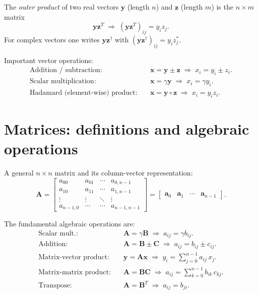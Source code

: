 The \emph{outer product} of two real vectors $\bm{y}$ (length $n$)
and $\bm{z}$ (length $m$) is the $n\times m$ matrix
\[
  \bm{y}\bm{z}^{T} \;\Longrightarrow\; (\bm{y}\bm{z}^T)_{ij} = y_i z_j.
\]
For complex vectors one writes $\bm{y}\bm{z}^{\dagger}$ with
$(\bm{y}\bm{z}^{\dagger})_{ij}=y_i z_j^*$.

Important vector operations:
\begin{align*}
  \text{Addition / subtraction:}\quad
      &\bm{x} = \bm{y}\pm\bm{z} \;\Rightarrow\; x_i = y_i\pm z_i.\\
  \text{Scalar multiplication:}\quad
      &\bm{x} = \gamma\bm{y} \;\Rightarrow\; x_i = \gamma y_i.\\
  \text{Hadamard (element-wise) product:}\quad
      &\bm{x} = \bm{y}\circ\bm{z} \;\Rightarrow\; x_i = y_i z_i.
\end{align*}

\section{Matrices: definitions and algebraic operations}
\label{sec:matrices}

A general $n\times n$ matrix and its column-vector representation:
\[
  \bm{A}
  = \begin{bmatrix}
      a_{00} & a_{01} & \cdots & a_{0,n-1} \\
      a_{10} & a_{11} & \cdots & a_{1,n-1} \\
      \vdots & \vdots & \ddots & \vdots    \\
      a_{n-1,0} & \cdots & \cdots & a_{n-1,n-1}
    \end{bmatrix}
  = \begin{bmatrix}
      \bm{a}_0 & \bm{a}_1 & \cdots & \bm{a}_{n-1}
    \end{bmatrix}.
\]

The fundamental algebraic operations are:
\begin{align*}
  \text{Scalar mult.:}\quad
      &\bm{A}=\gamma\bm{B} \;\Rightarrow\; a_{ij} = \gamma b_{ij}.\\[2pt]
  \text{Addition:}\quad
      &\bm{A}=\bm{B}\pm\bm{C} \;\Rightarrow\; a_{ij} = b_{ij}\pm c_{ij}.\\[2pt]
  \text{Matrix-vector product:}\quad
      &\bm{y}=\bm{A}\bm{x} \;\Rightarrow\;
          y_i = \sum_{j=0}^{n-1} a_{ij}\,x_j.\\[2pt]
  \text{Matrix-matrix product:}\quad
      &\bm{A}=\bm{B}\bm{C} \;\Rightarrow\;
          a_{ij} = \sum_{k=0}^{n-1} b_{ik}\,c_{kj}.\\[2pt]
  \text{Transpose:}\quad
      &\bm{A}=\bm{B}^{T} \;\Rightarrow\; a_{ij} = b_{ji}.
\end{align*}

